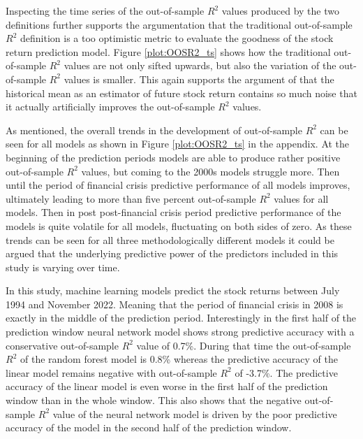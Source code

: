\documentclass[12pt]{article}
\begin{document}
Inspecting the time series of the out-of-sample $R^2$ values produced by the two definitions further supports the argumentation that the traditional out-of-sample $R^2$ definition is a too optimistic metric to evaluate the goodness of the stock return prediction model. Figure \ref{plot:OOSR2_ts} shows how the traditional out-of-sample $R^2$ values are not only sifted upwards, but also the variation of the out-of-sample $R^2$ values is smaller. This again supports the argument of \citet{guetal} that the historical mean as an estimator of future stock return contains so much noise that it actually artificially improves the out-of-sample $R^2$ values.\footnotemark {}  \par

As mentioned, the overall trends in the development of out-of-sample $R^2$ can be seen for all models as shown in Figure \ref{plot:OOSR2_ts} in the appendix. At the beginning of the prediction periods models are able to produce rather positive out-of-sample $R^2$ values, but coming to the 2000s models struggle more. Then until the period of financial crisis predictive performance of all models improves, ultimately leading to more than five percent out-of-sample $R^2$ values for all models. Then in post post-financial crisis period predictive performance of the models is quite volatile for all models, fluctuating on both sides of zero. As these trends can be seen for all three methodologically different models it could be argued that the underlying predictive power of the predictors included in this study is varying over time. \par

In this study, machine learning models predict the stock returns between July 1994 and November 2022. Meaning that the period of financial crisis in 2008 is exactly in the middle of the prediction period. Interestingly in the first half of the prediction window neural network model shows strong predictive accuracy with a conservative out-of-sample $R^2$ value of 0.7\%. During that time the out-of-sample $R^2$ of the random forest model is 0.8\% whereas the predictive accuracy of the linear model remains negative with out-of-sample $R^2$ of -3.7\%. The predictive accuracy of the linear model is even worse in the first half of the prediction window than in the whole window. This also shows that the negative out-of-sample $R^2$ value of the neural network model is driven by the poor predictive accuracy of the model in the second half of the prediction window. \par
\end{document}

